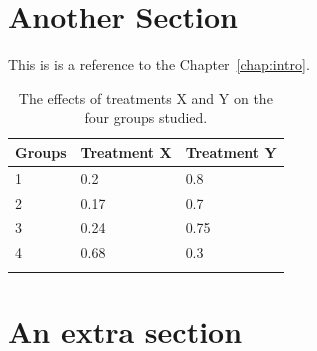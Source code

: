 \section{Another Section}\label{sec:another}
This is is a reference to the Chapter~\ref{chap:intro}.


\begin{table}[htb]
\caption{The effects of treatments X and Y on the four groups studied.}%
\label{tab:treatments}
\centering
\begin{tabular}{l l l}
\toprule
Groups & Treatment X & Treatment Y \\
\midrule
1 & 0.2 & 0.8\\
2 & 0.17 & 0.7\\
3 & 0.24 & 0.75\\
4 & 0.68 & 0.3\\
\bottomrule\\
\end{tabular}
\end{table}


\Blindtext%


\lipsum[6]

\section{An extra section}
\Blindtext%
	
\Blindtext%

